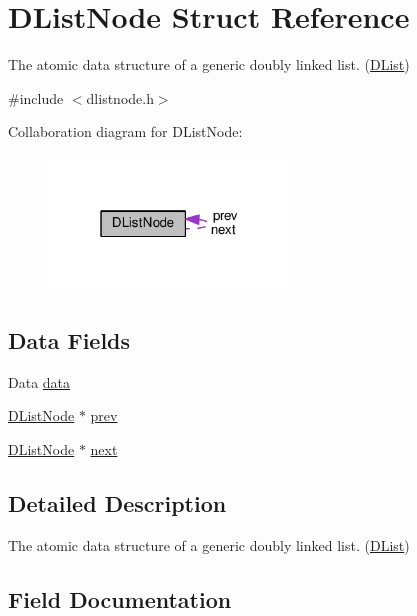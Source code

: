 \hypertarget{struct_d_list_node}{}\section{D\+List\+Node Struct Reference}
\label{struct_d_list_node}


The atomic data structure of a generic doubly linked list. (\hyperlink{struct_d_list}{D\+List})  




{\ttfamily \#include $<$dlistnode.\+h$>$}



Collaboration diagram for D\+List\+Node\+:
\nopagebreak
\begin{figure}[H]
\begin{center}
\leavevmode
\includegraphics[width=183pt]{struct_d_list_node__coll__graph}
\end{center}
\end{figure}
\subsection*{Data Fields}
\begin{DoxyCompactItemize}
\item 
Data \hyperlink{struct_d_list_node_a6cd5475316bf41a2c56ffcc5de826b99}{data}
\item 
\hyperlink{struct_d_list_node}{D\+List\+Node} $\ast$ \hyperlink{struct_d_list_node_adb1424a5de3d7550dd098aa2b7e8f493}{prev}
\item 
\hyperlink{struct_d_list_node}{D\+List\+Node} $\ast$ \hyperlink{struct_d_list_node_a32e241d0c324727bdb3782359f1ec32d}{next}
\end{DoxyCompactItemize}


\subsection{Detailed Description}
The atomic data structure of a generic doubly linked list. (\hyperlink{struct_d_list}{D\+List}) 

\subsection{Field Documentation}
